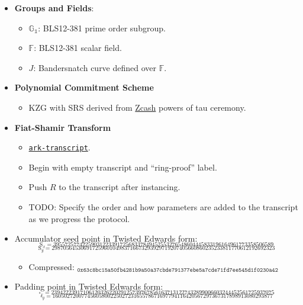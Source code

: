 \documentclass[
]{article}
\providecommand{\tightlist}{%
  \setlength{\itemsep}{0pt}\setlength{\parskip}{0pt}}
\begin{document}
\begin{itemize}
\item
  \textbf{Groups and Fields}:

  \begin{itemize}
  \tightlist
  \item
    \(\mathbb{G_1}\): BLS12-381 prime order subgroup.
  \item
    \(\mathbb{F}\): BLS12-381 scalar field.
  \item
    \(J\): Bandersnatch curve defined over \(\mathbb{F}\).
  \end{itemize}
\item
  \textbf{Polynomial Commitment Scheme}

  \begin{itemize}
  \tightlist
  \item
    KZG with SRS derived from
    \href{https://zfnd.org/conclusion-of-the-powers-of-tau-ceremony}{Zcash}
    powers of tau ceremony.
  \end{itemize}
\item
  \textbf{Fiat-Shamir Transform}

  \begin{itemize}
  \tightlist
  \item
    \href{https://crates.io/crates/ark-transcript}{\texttt{ark-transcript}}.
  \item
    Begin with empty transcript and ``ring-proof'' label.
  \item
    Push \(R\) to the transcript after instancing.
  \item
    TODO: Specify the order and how parameters are added to the
    transcript as we progress the protocol.
  \end{itemize}
\item
  Accumulator seed point in Twisted Edwards form:
  \[_{\text{S}_x = 3955725774225903122339172568337849452553276548604445833196164961773358506589}\]
  \[_{\text{S}_y = 29870564530691725960104983716673293929719207405660860235233811770612192692323}\]

  \begin{itemize}
  \tightlist
  \item
    Compressed:
    \(_{\texttt{0x63c8bc15a50fb4281b9a50a37cbde791377ebe5a7cde71fd7ee545d1f0230a42}}\)
  \end{itemize}
\item
  Padding point in Twisted Edwards form:
  \[_{\square_x = 23942223917106120326220291257397678561637131227432899006603244452561725937075}\]
  \[_{\square_y = 1605027200774560580022502723165578671697794116420567297367317898913080293877}\]


\end{itemize}
\end{document}
